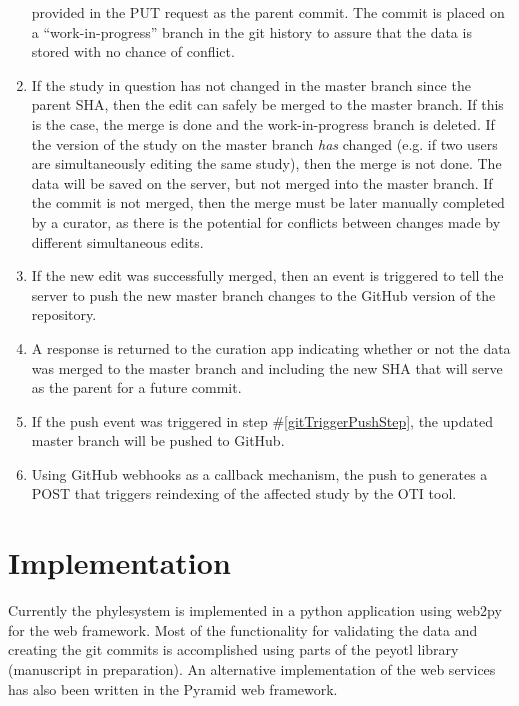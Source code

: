 \documentclass{bioinfo}
\newcommand{\ps}{phylesystem\xspace}
\begin{document}
\begin{methods}
\begin{enumerate}
        provided in the PUT request as the parent commit. The commit is placed on a 
        ``work-in-progress'' branch in the git history to assure that the data is stored with 
        no chance of conflict.
    \item \label{gitMergeStep} If the study in question has not changed in the master branch 
        since the parent SHA, then the edit can safely be merged to the master branch.
        If this is the case, the merge is done and the work-in-progress branch is deleted.
        If the version of the study on the master branch {\em has} changed (e.g. if two users are simultaneously editing the same study),
        then the merge is not done. The data will be saved on the server, but not merged into the master branch.
        If the commit is not merged, then the merge must be later manually completed by a curator, as there is the potential for conflicts between changes made by different simultaneous edits.
    \item\label{gitTriggerPushStep}  If the new edit was successfully merged, then an event is triggered to tell the server to push the new master branch changes to the GitHub version
        of the repository.
    \item\label{respondStep} A response is returned to the curation app indicating whether or not the data was 
        merged to the master branch and including the new SHA that will serve as the parent for a future commit.
    \item\label{pushStep}  If the push event was triggered in step \#\ref{gitTriggerPushStep}, the updated master branch will be pushed to GitHub.
    \item\label{webHookStep} Using GitHub webhooks as a callback mechanism, the push to generates a POST that triggers reindexing
        of the affected study by the OTI tool.
\end{enumerate}

\section{Implementation}
Currently the \ps is implemented in a python application using web2py for the web framework.
Most of the functionality for validating the data and creating the git commits is accomplished using
    parts of the peyotl library (manuscript in preparation).
An alternative implementation of the web services has also been written in the Pyramid
    web framework.


\end{methods}
\end{document}
